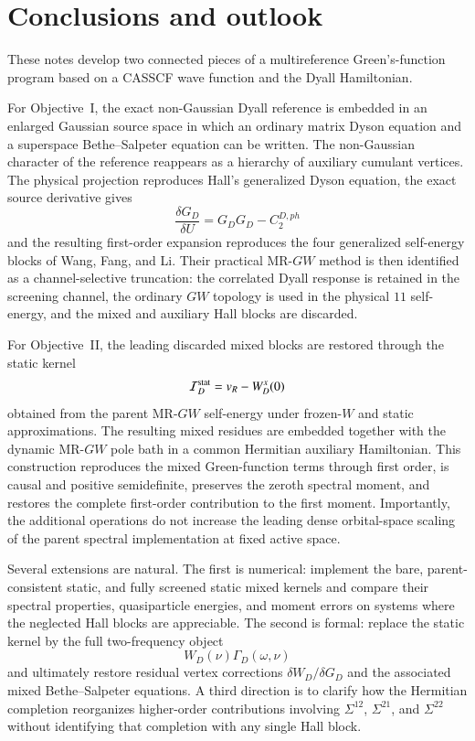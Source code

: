 \documentclass[aip,jcp,reprint,noshowkeys,superscriptaddress]{revtex4-1}
\begin{document}
\section{Conclusions and outlook}
\label{sec:conclusion}

These notes develop two connected pieces of a multireference Green's-function
program based on a CASSCF wave function and the Dyall Hamiltonian.

For Objective~I, the exact non-Gaussian Dyall reference is embedded in an
enlarged Gaussian source space in which an ordinary matrix Dyson equation and
a superspace Bethe--Salpeter equation can be written.  The non-Gaussian
character of the reference reappears as a hierarchy of auxiliary cumulant
vertices.  The physical projection reproduces Hall's generalized Dyson
equation, the exact source derivative gives
\begin{equation}
  \frac{\delta G_D}{\delta U}
  =
  G_DG_D-C_2^{D,ph}
\end{equation}
and the resulting first-order expansion reproduces the four generalized
self-energy blocks of Wang, Fang, and Li.  Their practical MR-$GW$ method is
then identified as a channel-selective truncation: the correlated Dyall
response is retained in the screening channel, the ordinary $GW$ topology is
used in the physical $11$ self-energy, and the mixed and auxiliary Hall blocks
are discarded.

For Objective~II, the leading discarded mixed blocks are restored through the
static kernel
\begin{equation}
  \mathcal I_D^{\rm stat}
  =
  v_R-W_D^x(0)
\end{equation}
obtained from the parent MR-$GW$ self-energy under frozen-$W$ and static
approximations.  The resulting mixed residues are embedded together with the
dynamic MR-$GW$ pole bath in a common Hermitian auxiliary Hamiltonian.  This
construction reproduces the mixed Green-function terms through first order,
is causal and positive semidefinite, preserves the zeroth spectral moment,
and restores the complete first-order contribution to the first moment.
Importantly, the additional operations do not increase the leading dense
orbital-space scaling of the parent spectral implementation at fixed active
space.

Several extensions are natural.  The first is numerical: implement the bare,
parent-consistent static, and fully screened static mixed kernels and compare
their spectral properties, quasiparticle energies, and moment errors on
systems where the neglected Hall blocks are appreciable.  The second is
formal: replace the static kernel by the full two-frequency object
\begin{equation}
  W_D(\nu)\Gamma_D(\omega,\nu)
\end{equation}
and ultimately restore residual vertex corrections
$\delta W_D/\delta G_D$ and the associated mixed Bethe--Salpeter equations.
A third direction is to clarify how the Hermitian completion reorganizes
higher-order contributions involving $\Sigma^{12}$, $\Sigma^{21}$, and
$\Sigma^{22}$ without identifying that completion with any single Hall block.
\end{document}
